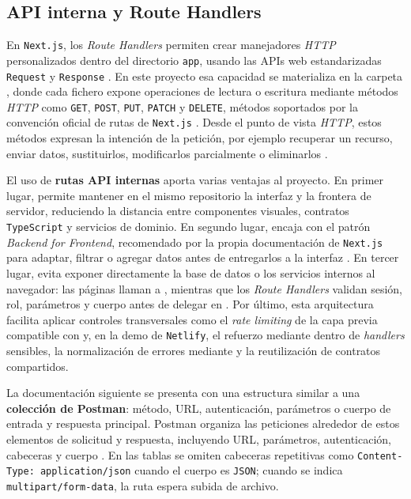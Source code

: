 \subsection{API interna y Route Handlers}
\label{subsec:internalApiRoutes}

En \texttt{Next.js}, los \textit{Route Handlers} permiten crear manejadores \textit{HTTP} personalizados dentro del directorio \texttt{app}, usando las APIs web estandarizadas \texttt{Request} y \texttt{Response} \citep{nextjsroutehandlers2026}. En este proyecto esa capacidad se materializa en la carpeta , donde cada fichero  expone operaciones de lectura o escritura mediante métodos \textit{HTTP} como \texttt{GET}, \texttt{POST}, \texttt{PUT}, \texttt{PATCH} y \texttt{DELETE}, métodos soportados por la convención oficial de rutas de \texttt{Next.js} \citep{nextjsroutefile2026}. Desde el punto de vista \textit{HTTP}, estos métodos expresan la intención de la petición, por ejemplo recuperar un recurso, enviar datos, sustituirlos, modificarlos parcialmente o eliminarlos \citep{mdnhttpmethods2026}.

El uso de \textbf{rutas API internas} aporta varias ventajas al proyecto. En primer lugar, permite mantener en el mismo repositorio la interfaz y la frontera de servidor, reduciendo la distancia entre componentes visuales, contratos \texttt{TypeScript} y servicios de dominio. En segundo lugar, encaja con el patrón \textit{Backend for Frontend}, recomendado por la propia documentación de \texttt{Next.js} para adaptar, filtrar o agregar datos antes de entregarlos a la interfaz \citep{nextjsbackendforfrontend2026}. En tercer lugar, evita exponer directamente la base de datos o los servicios internos al navegador: las páginas llaman a , mientras que los \textit{Route Handlers} validan sesión, rol, parámetros y cuerpo antes de delegar en . Por último, esta arquitectura facilita aplicar controles transversales como el \textit{rate limiting} de la capa previa compatible con  y, en la demo de \texttt{Netlify}, el refuerzo mediante  dentro de \textit{handlers} sensibles, la normalización de errores mediante  y la reutilización de contratos compartidos.

La documentación siguiente se presenta con una estructura similar a una \textbf{colección de Postman}: método, URL, autenticación, parámetros o cuerpo de entrada y respuesta principal. Postman organiza las peticiones alrededor de estos elementos de solicitud y respuesta, incluyendo URL, parámetros, autenticación, cabeceras y cuerpo \citep{postmanrequests2026}. En las tablas se omiten cabeceras repetitivas como \texttt{Content-Type: application/json} cuando el cuerpo es \texttt{JSON}; cuando se indica \texttt{multipart/form-data}, la ruta espera subida de archivo.

